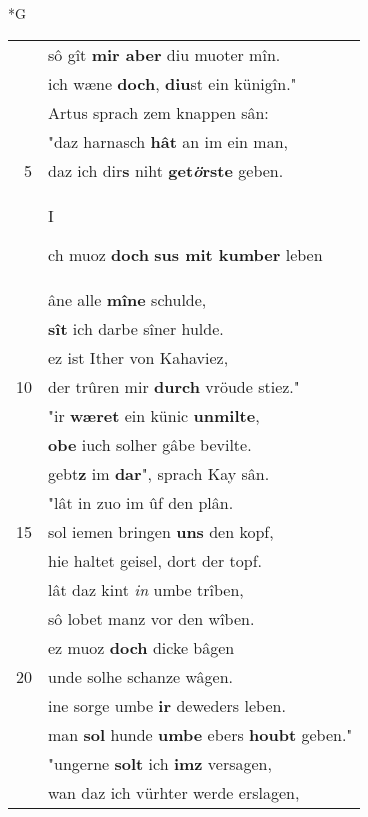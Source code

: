 \documentclass[8pt,a4paper,notitlepage]{article}
\begin{document}
\begin{table}[ht]
\begin{minipage}[t]{0.5\linewidth}
\end{minipage}
\end{table}
\newpage
\begin{table}[ht]
\begin{minipage}[t]{0.5\linewidth}
\small
\begin{center}*G
\end{center}
\begin{tabular}{rl}
 & sô gît \textbf{mir aber} diu muoter mîn.\\ 
 & ich wæne \textbf{doch}, \textbf{diu}st ein künigîn."\\ 
 & Artus sprach zem knappen sân:\\ 
 & "daz harnasch \textbf{hât} an im ein man,\\ 
5 & daz ich dir\textbf{s} niht \textbf{get\textit{ö}rste} geben.\\ 
 & \begin{large}I\end{large}ch muoz \textbf{doch} \textbf{sus mit kumber} leben\\ 
 & âne alle \textbf{mîne} schulde,\\ 
 & \textbf{sît} ich darbe sîner hulde.\\ 
 & ez ist Ither von Kahaviez,\\ 
10 & der trûren mir \textbf{durch} vröude stiez."\\ 
 & "ir \textbf{wæret} ein künic \textbf{unmilte},\\ 
 & \textbf{obe} iuch solher gâbe bevilte.\\ 
 & gebt\textbf{z} im \textbf{dar}", sprach Kay sân.\\ 
 & "lât in zuo im ûf den plân.\\ 
15 & sol iemen bringen \textbf{uns} den kopf,\\ 
 & hie haltet geisel, dort der topf.\\ 
 & lât daz kint \textit{in} umbe trîben,\\ 
 & sô lobet manz vor den wîben.\\ 
 & ez muoz \textbf{doch} dicke bâgen\\ 
20 & unde solhe schanze wâgen.\\ 
 & ine sorge umbe \textbf{ir} deweders leben.\\ 
 & man \textbf{sol} hunde \textbf{umbe} ebers \textbf{houbt} geben."\\ 
 & "ungerne \textbf{solt} ich \textbf{imz} versagen,\\ 
 & wan daz ich vürhter werde erslagen,\\ 

\end{tabular}
\end{minipage}
\end{table}
\end{document}
